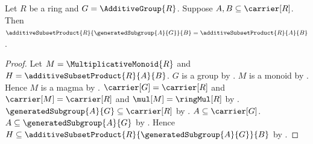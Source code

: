 \begin{theorem}\label{additive_subset_product_generated_left}
    Let $R$ be a ring and $G=\AdditiveGroup{R}$.
    Suppose $A,B\subseteq\carrier[R]$.
    Then
        $\additiveSubsetProduct{R}{\generatedSubgroup{A}{G}}{B}
            =\additiveSubsetProduct{R}{A}{B}$.
\end{theorem}
\begin{proof}
    Let $M=\MultiplicativeMonoid{R}$ and
        $H=\additiveSubsetProduct{R}{A}{B}$.
    $G$ is a group by .
    $M$ is a monoid by .
    Hence $M$ is a magma by .
    $\carrier[G]=\carrier[R]$ and $\carrier[M]=\carrier[R]$ and
        $\mul[M]=\ringMul[R]$ by
        .
    $\generatedSubgroup{A}{G}\subseteq\carrier[R]$ by
        .
    $A\subseteq\carrier[G]$.
    $A\subseteq\generatedSubgroup{A}{G}$ by
        .
    Hence $H\subseteq
        \additiveSubsetProduct{R}{\generatedSubgroup{A}{G}}{B}$ by
        .


\end{proof}
